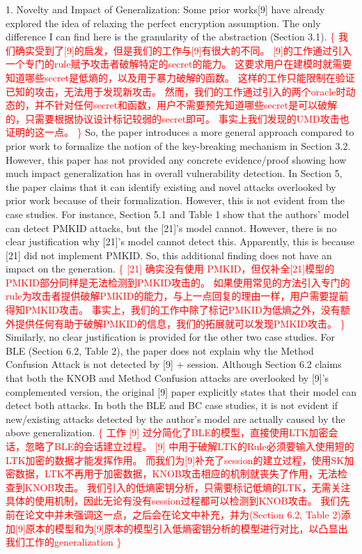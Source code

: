 \documentclass{article}
\newcommand{\response}[1]{\textcolor{red}{\{#1\}}}
\begin{document}
1. Novelty and Impact of Generalization: 
Some prior works[9] have already explored the idea of relaxing the perfect encryption assumption. 
The only difference I can find here is the granularity of the abstraction (Section 3.1). 
\response{
    我们确实受到了[9]的启发，但是我们的工作与[9]有很大的不同。
    [9]的工作通过引入一个专门的rule赋予攻击者破解特定的secret的能力。
    这要求用户在建模时就需要知道哪些secret是低熵的，以及用于暴力破解的函数。
    这样的工作只能限制在验证已知的攻击，无法用于发现新攻击。
    然而，我们的工作通过引入的两个oracle时动态的，并不针对任何secret和函数，用户不需要预先知道哪些secret是可以破解的，只需要根据协议设计标记较弱的secret即可。
    事实上我们发现的UMD攻击也证明的这一点。
}
So, the paper introduces a more general approach compared to prior work to formalize the notion of the key-breaking mechanism in Section 3.2. 
However, this paper has not provided any concrete evidence/proof showing how much impact generalization has in overall vulnerability detection. 
In Section 5, the paper claims that it can identify existing and novel attacks overlooked by prior work because of their formalization. 
However, this is not evident from the case studies. 
For instance, Section 5.1 and Table 1 show that the authors' model can detect PMKID attacks, but the [21]'s model cannot. 
However, there is no clear justification why [21]'s model cannot detect this. 
Apparently, this is because [21] did not implement PMKID. 
So, this additional finding does not have an impact on the generation. 
\response{
    [21] 确实没有使用 PMKID，但仅补全[21]模型的PMKID部分同样是无法检测到PMKID攻击的。
    如果使用常见的方法引入专门的rule为攻击者提供破解PMKID的能力，与上一点回复的理由一样，用户需要提前得知PMKID攻击。
    事实上，我们的工作中除了标记PMKID为低熵之外，没有额外提供任何有助于破解PMKID的信息，我们的拓展就可以发现PMKID攻击。
}
Similarly, no clear justification is provided for the other two case studies. 
For BLE (Section 6.2, Table 2), the paper does not explain why the Method Confusion Attack is not detected by [9] + session. 
Although Section 6.2 claims that both the KNOB and Method Confusion attacks are overlooked by [9]’s complemented version, 
the original [9] paper explicitly states that their model can detect both attacks. 
In both the BLE and BC case studies, it is not evident if new/existing attacks detected by the author's model are actually caused by the above generalization.
\response{
    工作 [9] 过分简化了BLE的模型，直接使用LTK加密会话，忽略了BLE的会话建立过程。
    [9] 中用于破解LTK的Rule必须要输入使用短的LTK加密的数据才能发挥作用。
    而我们为[9]补充了session的建立过程，使用SK加密数据，LTK不再用于加密数据，KNOB攻击相应的机制就丧失了作用，无法检查到KNOB攻击。
    我们引入的低熵密钥分析，只需要标记低熵的LTK，无需关注具体的使用机制，因此无论有没有session过程都可以检测到KNOB攻击。
    我们先前在论文中并未强调这一点，之后会在论文中补充，并为(Section 6.2, Table 2)添加[9]原本的模型和为[9]原本的模型引入低熵密钥分析的模型进行对比，以凸显出我们工作的generalization
}
\end{document}
